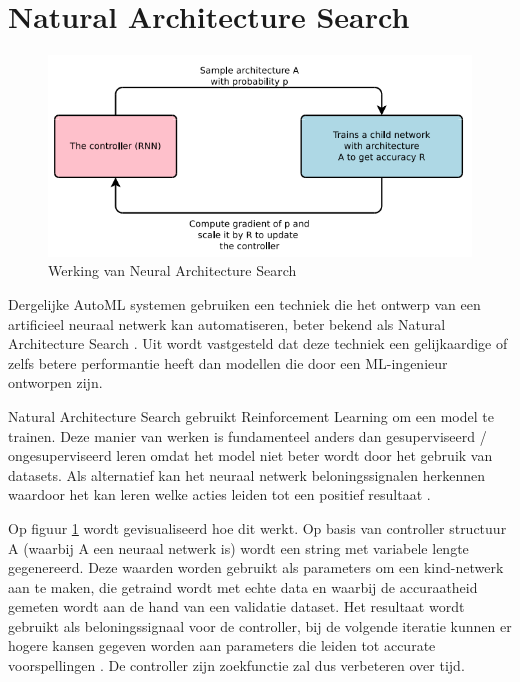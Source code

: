 \section{Natural Architecture Search}

\begin{figure}
    \includegraphics[width=\linewidth]{img/nas.png}
    \caption{Werking van Neural Architecture Search}
    \label{fig:nas-bp}
\end{figure}

Dergelijke AutoML systemen gebruiken een techniek die het ontwerp van een artificieel neuraal netwerk kan automatiseren, beter bekend als Natural Architecture Search \autocite{Elsken2019}. Uit \textcite{ZophL2016} wordt vastgesteld dat deze techniek een gelijkaardige of zelfs betere performantie heeft dan modellen die door een ML-ingenieur ontworpen zijn.

Natural Architecture Search gebruikt Reinforcement Learning om een model te trainen. Deze manier van werken is fundamenteel anders dan gesuperviseerd / ongesuperviseerd leren omdat het model niet beter wordt door het gebruik van datasets. Als alternatief kan het neuraal netwerk beloningssignalen herkennen waardoor het kan leren welke acties leiden tot een positief resultaat \autocite{Lievens2019}.

Op figuur \ref{fig:nas-bp} wordt gevisualiseerd hoe dit werkt. Op basis van controller structuur A (waarbij A een neuraal netwerk is) wordt een string met variabele lengte gegenereerd. Deze waarden worden gebruikt als parameters om een kind-netwerk aan te maken, die getraind wordt met echte data en waarbij de accuraatheid gemeten wordt aan de hand van een validatie dataset. Het resultaat wordt gebruikt als beloningssignaal voor de controller, bij de volgende iteratie kunnen er hogere kansen gegeven worden aan parameters die leiden tot accurate voorspellingen \autocite{ZophL2016}. De controller zijn zoekfunctie zal dus verbeteren over tijd.

